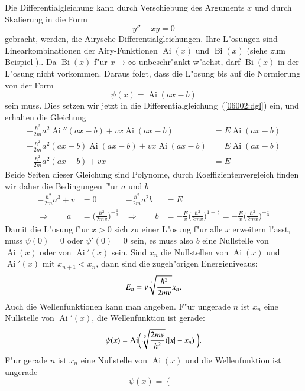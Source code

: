 \begin{loesung}
Die Differentialgleichung kann durch Verschiebung des Arguments $x$ 
und durch Skalierung in die Form
\[
y''-xy=0
\]
gebracht, werden, die Airysche Differentialgleichungen. 
Ihre L"osungen sind Linearkombinationen der Airy-Funktionen
$\operatorname{Ai}(x)$ und $\operatorname{Bi}(x)$ (siehe zum Beispiel
\cite{skript:airy})..
Da $\operatorname{Bi}(x)$ f"ur $x\to\infty$ unbeschr"ankt
w"achst, darf $\operatorname{Bi}(x)$ in der L"osung nicht
vorkommen.
Daraus folgt, dass die L"osung bis auf die Normierung von der
Form
\[
\psi(x)=\operatorname{Ai}(ax-b)
\]
sein muss.
Dies setzen wir jetzt in die Differentialgleichung~(\ref{06002:dgl}) ein,
und erhalten die Gleichung
\begin{align*}
-\frac{\hbar^2}{2m}a^2\operatorname{Ai}''(ax-b)
+
vx\operatorname{Ai}(ax-b)
&=
E\operatorname{Ai}(ax-b)
\\
-\frac{\hbar^2}{2m}a^2(ax-b)\operatorname{Ai}(ax-b)
+
vx\operatorname{Ai}(ax-b)
&=
E\operatorname{Ai}(ax-b)
\\
-\frac{\hbar^2}{2m}a^2(ax-b)
+
vx
&=
E
\end{align*}
Beide Seiten dieser Gleichung sind Polynome, durch Koeffizientenvergleich
finden wir daher die Bedingungen f"ur $a$ und $b$
\begin{align*}
-\frac{\hbar^2}{2m}a^3+v&=0
&
-\frac{\hbar^2}{2m}a^2b&=E
\\
\Rightarrow\qquad
a &= \biggl(\frac{\hbar^2}{2mv}\biggr)^{-\frac13}
&
\Rightarrow\qquad
b &= -\frac{E}{v}\biggl(\frac{\hbar^2}{2mv}\biggr)^{1-\frac23}
= -\frac{E}{v}\biggl(\frac{\hbar^2}{2mv}\biggr)^{-\frac13}
\end{align*}
Damit die L"osung f"ur $x>0$ sich zu einer L"osung f"ur alle $x$
erweitern l"asst, muss $\psi(0)=0$ oder $\psi'(0)=0$ sein,
es muss also $b$ eine Nullstelle von $\operatorname{Ai}(x)$ oder
von $\operatorname{Ai}'(x)$ sein.
Sind $x_n$ die Nullstellen von $\operatorname{Ai}(x)$ und
$\operatorname{Ai}'(x)$ mit $x_{n+1}<x_n$, dann sind die zugeh"origen
Energieniveaus:
\[
E_n=v\root 3\of{\frac{\hbar^2}{2mv}} x_n.
\]
Auch die Wellenfunktionen kann man angeben.
F"ur ungerade $n$ ist $x_n$ eine Nullstelle von $\operatorname{Ai}'(x)$,
die Wellenfunktion ist gerade:
\begin{equation}
\psi(x)
=
\operatorname{Ai}\biggl( \root3\of{\frac{2mv}{\hbar^2}}(|x|-x_n) \biggr).
\end{equation}
F"ur gerade $n$ ist $x_n$ eine Nullstelle von $\operatorname{Ai}(x)$
und die Wellenfunktion ist ungerade
\begin{equation}
\psi(x)
=
\begin{cases}

\end{cases}
\end{equation}
\end{loesung}
